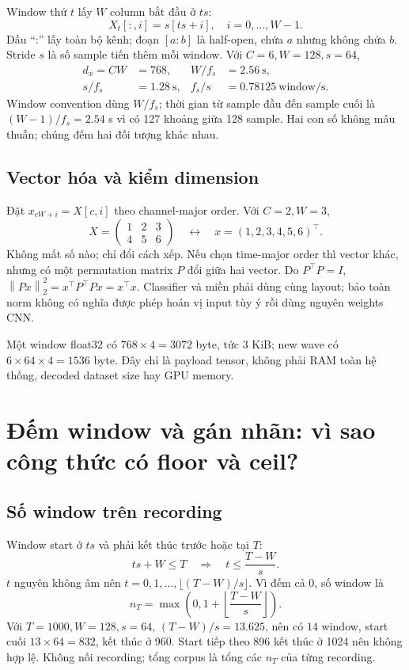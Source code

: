 \documentclass[11pt,a4paper]{article}
\newcommand{\norm}[1]{\left\lVert#1\right\rVert}
\theoremstyle{definition}
\begin{document}
Window thứ $t$ lấy $W$ column bắt đầu ở $ts$:
\begin{equation}
X_t[:,i]=s[ts+i],\quad i=0,\ldots,W-1.
\label{eq:window}
\end{equation}
Dấu ``:'' lấy toàn bộ kênh; đoạn $[a:b]$ là half-open, chứa $a$ nhưng không
chứa $b$. Stride $s$ là số sample tiến thêm mỗi window. Với $C=6,W=128,s=64$,
\begin{align}
d_x=CW&=768, & W/f_s&=2.56\ \mathrm{s},\\
s/f_s&=1.28\ \mathrm{s}, & f_s/s&=0.78125\ \text{window/s}.
\end{align}
Window convention dùng $W/f_s$; thời gian từ sample đầu đến sample cuối là
$(W-1)/f_s=2.54$ s vì có 127 khoảng giữa 128 sample. Hai con số không mâu
thuẫn; chúng đếm hai đối tượng khác nhau.

\subsection{Vector hóa và kiểm dimension}
Đặt $x_{cW+i}=X[c,i]$ theo channel-major order. Với $C=2,W=3$,
\begin{equation}
X=\begin{pmatrix}1&2&3\\4&5&6\end{pmatrix}
\quad\longleftrightarrow\quad x=(1,2,3,4,5,6)^\top.
\end{equation}
Không mất số nào; chỉ đổi cách xếp. Nếu chọn time-major order thì vector
khác, nhưng có một permutation matrix $P$ đổi giữa hai vector. Do
$P^\top P=I$, $\norm{Px}_2^2=x^\top P^\top Px=x^\top x$.
Classifier và miền phải dùng cùng layout; bảo toàn norm không có nghĩa
được phép hoán vị input tùy ý rồi dùng nguyên weights CNN.

Một window float32 có $768\times4=3072$ byte, tức 3 KiB; new wave có
$6\times64\times4=1536$ byte. Đây chỉ là payload tensor, không phải RAM
toàn hệ thống, decoded dataset size hay GPU memory.

\section{Đếm window và gán nhãn: vì sao công thức có floor và ceil?}
\subsection{Số window trên recording}
Window start ở $ts$ và phải kết thúc trước hoặc tại $T$:
\begin{equation}
ts+W\le T\quad\Rightarrow\quad t\le\frac{T-W}{s}.
\end{equation}
$t$ nguyên không âm nên $t=0,1,\ldots,\lfloor(T-W)/s\rfloor$.
Vì đếm cả 0, số window là
\begin{equation}
n_T=\max\left(0,1+\left\lfloor\frac{T-W}{s}\right\rfloor\right).
\end{equation}
Với $T=1000,W=128,s=64$, $(T-W)/s=13.625$, nên có $14$ window,
start cuối $13\times64=832$, kết thúc ở 960. Start tiếp theo 896 kết thúc
ở 1024 nên không hợp lệ. Không nối recording; tổng corpus là tổng các
$n_T$ của từng recording.
\end{document}
